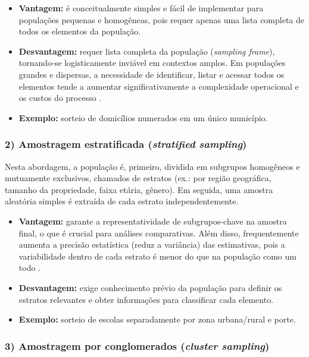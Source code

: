 \documentclass[12pt, a4paper, openany]{book}
\begin{document}
\begin{itemize}
\item \textbf{Vantagem:} \'e conceitualmente simples e f\'acil de implementar para popula\c{c}\~oes pequenas e homog\^eneas, pois requer apenas uma lista completa de todos os elementos da popula\c{c}\~ao.
\item \textbf{Desvantagem:} requer lista completa da popula\c{c}\~ao (\textit{sampling frame}), tornando-se logisticamente invi\'avel em contextos amplos. Em popula\c{c}\~oes grandes e dispersas, a necessidade de identificar, listar e acessar todos os elementos tende a aumentar significativamente a complexidade operacional e os custos do processo \citep{bryman2012social,neuman2014social}.
\item \textbf{Exemplo:} sorteio de domic\'ilios numerados em um \'unico munic\'ipio.
\end{itemize}

\subsubsection*{2) Amostragem estratificada (\textit{stratified sampling})}

Nesta abordagem, a popula\c{c}\~ao \'e, primeiro, dividida em subgrupos homog\^eneos e mutuamente exclusivos, chamados de estratos (ex.: por regi\~ao geogr\'afica, tamanho da propriedade, faixa et\'aria, g\^enero). Em seguida, uma amostra aleat\'oria simples \'e extra\'ida de cada estrato independentemente.

\begin{itemize}
\item \textbf{Vantagem:} garante a representatividade de subgrupos-chave na amostra final, o que \'e crucial para an\'alises comparativas. Al\'em disso, frequentemente aumenta a precis\~ao estat\'istica (reduz a vari\^ancia) das estimativas, pois a variabilidade dentro de cada estrato \'e menor do que na popula\c{c}\~ao como um todo \citep{neuman2014social,iarossi2006power,gertler2018impact}.
\item \textbf{Desvantagem:} exige conhecimento pr\'evio da popula\c{c}\~ao para definir os estratos relevantes e obter informa\c{c}\~oes para classificar cada elemento.
\item \textbf{Exemplo:} sorteio de escolas separadamente por zona urbana/rural e porte.
\end{itemize}

\subsubsection*{3) Amostragem por conglomerados (\textit{cluster sampling})}
\end{document}

